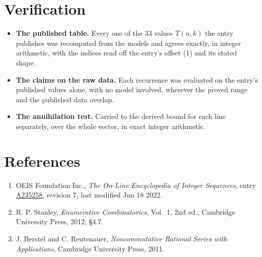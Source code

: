 \documentclass[11pt]{article}
\theoremstyle{definition}
\begin{document}
\section{Verification}

\begin{itemize}

\item {\bfseries The published table.} Every one of the 33 values $T(n,k)$ the entry publishes was recomputed from the models and agrees exactly, in integer arithmetic, with the indices read off the entry's offset (1) and its stated shape.

\item {\bfseries The claims on the raw data.} Each recurrence was evaluated on the entry's published values alone, with no model involved, wherever the proved range and the published data overlap.

\item {\bfseries The annihilation test.} Carried to the derived bound for each line separately, over the whole vector, in exact integer arithmetic.

\end{itemize}

\section{References}

\begin{enumerate}

\item OEIS Foundation Inc., \emph{The On-Line Encyclopedia of Integer Sequences}, entry \href{https://oeis.org/A235258}{A235258}, revision 7, last modified Jun 18 2022.

\item R. P. Stanley, \emph{Enumerative Combinatorics}, Vol.~1, 2nd ed., Cambridge University Press, 2012; \S4.7.

\item J. Berstel and C. Reutenauer, \emph{Noncommutative Rational Series with Applications}, Cambridge University Press, 2011.

\end{enumerate}
\end{document}
